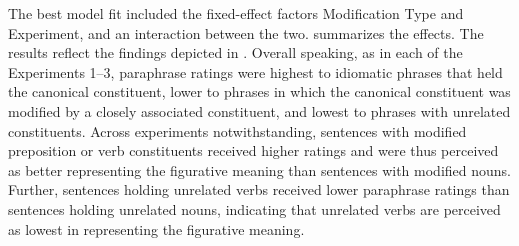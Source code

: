 \documentclass[output=paper]{langsci/langscibook}
\begin{document}
The best model fit included the fixed-effect factors Modification Type and Experiment, and an interaction between the two.   summarizes the effects. The results reflect the findings depicted in .  Overall speaking, as in each of the Experiments 1--3, paraphrase ratings were highest to idiomatic phrases that held the canonical constituent, lower to phrases in which the canonical constituent was modified by a closely associated constituent, and lowest to phrases with unrelated constituents. Across experiments notwithstanding, sentences with modified preposition or verb constituents received higher ratings and were thus perceived as better representing the figurative meaning than sentences with modified nouns. Further, sentences holding unrelated verbs received lower paraphrase ratings than sentences holding unrelated nouns, indicating that unrelated verbs are perceived as lowest in representing the figurative meaning. 

\begin{table}
\caption{Fixed effects of the predictors in the linear mixed-effect model for the paraphrase ratings combining Experiments 1--3. \textit{Notes:} significance code: *** < 0.0001, * < 0.05.\label{tab:Table8}}
\end{table}
\end{document}
